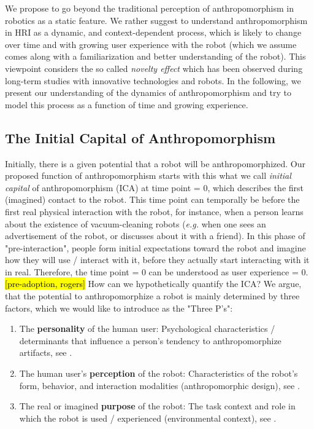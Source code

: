 \documentclass[twocolumn]{svjour3}          %
\begin{document}
We propose to go beyond the traditional perception of anthropomorphism in robotics as a static feature.  We rather suggest to understand anthropomorphism in HRI as a dynamic, and context-dependent process, which is likely to change over time and with growing user experience with the robot (which we assume comes along with a familiarization and better understanding of the robot). This viewpoint considers the so called \textit{novelty effect} which has been observed during long-term studies with innovative technologies and robots. In the following, we present our understanding of the dynamics of anthropomorphism and try to model this process as a function of time and growing experience.
 

\subsection{The Initial Capital of Anthropomorphism}
\label{sec:7.1}

	Initially, there is a given potential that a robot will be anthropomorphized. Our proposed function of anthropomorphism starts with this what we call \textit{initial capital} of anthropomorphism (ICA) at time point = 0, which describes the first (imagined) contact to the robot. This time point can temporally be before the first real physical interaction with the robot, for instance, when a person learns about the existence of vacuum-cleaning robots (\textit{e.g.} when one sees an advertisement of the robot, or discusses about it with a friend). In this phase of "pre-interaction", people form initial expectations toward the robot and imagine how they will use / interact with it, before they actually start interacting with it in real. Therefore, the time point = 0 can be understood as user experience = 0. \hl{[pre-adoption, rogers]} How can we hypothetically quantify the ICA? We argue, that the potential to anthropomorphize a robot is mainly determined by three factors, which we would like to introduce as the "Three P's":  
	
\begin{enumerate}

	\item The \textbf{personality} of the human user: Psychological characteristics / determinants that influence a person's tendency to anthropomorphize artifacts, see \cite{epley_seeing_2007}.
	
	\item The human user's \textbf{perception} of the robot: Characteristics of the robot's form, behavior, and interaction modalities (anthropomorphic design), see \cite{fong_survey_2003}.
	
	\item The real or imagined \textbf{purpose} of the robot: The task context and role in which the robot is used / experienced (environmental context), see \cite{joosse_what_2013}.

\end{enumerate}	
\end{document}
